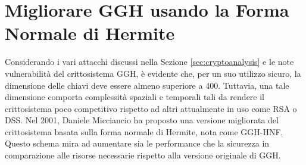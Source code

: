 \chapter{Migliorare GGH usando la Forma Normale di Hermite}
\label{cap:GGH-HNF}
%
%
Considerando i vari attacchi discussi nella Sezione \ref{sec:cryptoanalysis} e le note vulnerabilità 
del crittosistema GGH, è evidente che, per un suo utilizzo sicuro, la dimensione delle chiavi deve essere almeno superiore a 400. Tuttavia, una tale 
dimensione comporta complessità spaziali e temporali tali da rendere il crittosistema
poco competitivo rispetto ad altri attualmente in uso come RSA o DSS. Nel 2001, Daniele 
Micciancio \cite{HNF01} ha proposto una versione migliorata del crittosistema basata sulla 
forma normale di Hermite, nota come GGH-HNF. Questo schema mira ad aumentare sia le 
performance che la sicurezza in comparazione alle 
risorse necessarie rispetto alla versione originale di GGH.


%
%
